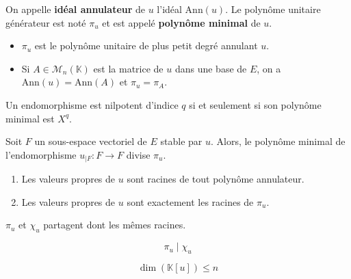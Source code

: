   \begin{definition}
    On appelle \textbf{idéal annulateur} de $u$ l'idéal $\mathrm{Ann}(u)$. Le polynôme unitaire générateur est noté $\pi_u$ et est appelé \textbf{polynôme minimal} de $u$.
  \end{definition}

  \begin{remark}
    \begin{itemize}
      \item $\pi_u$ est le polynôme unitaire de plus petit degré annulant $u$.
      \item Si $A \in \mathcal{M}_n(\mathbb{K})$ est la matrice de $u$ dans une base de $E$, on a $\mathrm{Ann}(u) = \mathrm{Ann}(A)$ et $\pi_u = \pi_A$.
    \end{itemize}
  \end{remark}

  \begin{example}
    Un endomorphisme est nilpotent d'indice $q$ si et seulement si son polynôme minimal est $X^q$.
  \end{example}

  \begin{proposition}
    Soit $F$ un sous-espace vectoriel de $E$ stable par $u$. Alors, le polynôme minimal de l'endomorphisme $u_{|F} : F \rightarrow F$ divise $\pi_u$.
  \end{proposition}

  \begin{proposition}
    \begin{enumerate}[label={\bfseries(\roman*)}]
      \item Les valeurs propres de $u$ sont racines de tout polynôme annulateur.
      \item Les valeurs propres de $u$ sont exactement les racines de $\pi_u$.
    \end{enumerate}
  \end{proposition}


  \begin{remark}
    $\pi_u$ et $\chi_u$ partagent dont les mêmes racines.
  \end{remark}


  \begin{theorem}
    \[ \pi_u \mid \chi_u \]
  \end{theorem}

  \begin{corollary}
    \[ \dim(\mathbb{K}[u]) \leq n \]
  \end{corollary}

